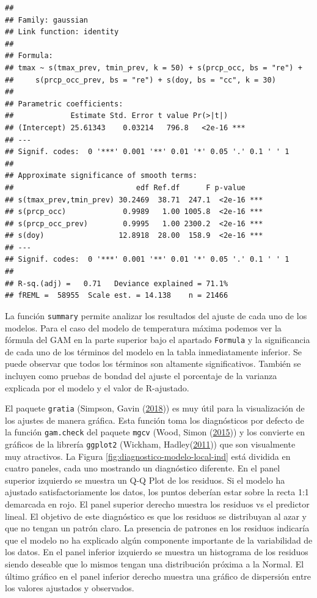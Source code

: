 \documentclass[
  12pt]{article}
\begin{document}
\begin{verbatim}
## 
## Family: gaussian 
## Link function: identity 
## 
## Formula:
## tmax ~ s(tmax_prev, tmin_prev, k = 50) + s(prcp_occ, bs = "re") + 
##     s(prcp_occ_prev, bs = "re") + s(doy, bs = "cc", k = 30)
## 
## Parametric coefficients:
##             Estimate Std. Error t value Pr(>|t|)    
## (Intercept) 25.61343    0.03214   796.8   <2e-16 ***
## ---
## Signif. codes:  0 '***' 0.001 '**' 0.01 '*' 0.05 '.' 0.1 ' ' 1
## 
## Approximate significance of smooth terms:
##                            edf Ref.df      F p-value    
## s(tmax_prev,tmin_prev) 30.2469  38.71  247.1  <2e-16 ***
## s(prcp_occ)             0.9989   1.00 1005.8  <2e-16 ***
## s(prcp_occ_prev)        0.9995   1.00 2300.2  <2e-16 ***
## s(doy)                 12.8918  28.00  158.9  <2e-16 ***
## ---
## Signif. codes:  0 '***' 0.001 '**' 0.01 '*' 0.05 '.' 0.1 ' ' 1
## 
## R-sq.(adj) =   0.71   Deviance explained = 71.1%
## fREML =  58955  Scale est. = 14.138    n = 21466
\end{verbatim}

La función \texttt{summary} permite analizar los resultados del ajuste de cada uno de los modelos. Para el caso del modelo de temperatura máxima podemos ver la fórmula del GAM en la parte superior bajo el apartado \texttt{Formula} y la significancia de cada uno de los términos del modelo en la tabla inmediatamente inferior. Se puede observar que todos los términos son altamente significativos. También se incluyen como pruebas de bondad del ajuste el porcentaje de la varianza explicada por el modelo y el valor de R-ajustado.

El paquete \texttt{gratia} (Simpson, Gavin (\protect\hyperlink{ref-RN5389}{2018})) es muy útil para la visualización de los ajustes de manera gráfica. Esta función toma los diagnósticos por defecto de la función \texttt{gam.check} del paquete \texttt{mgcv} (Wood, Simon (\protect\hyperlink{ref-RN5393}{2015})) y los convierte en gráficos de la librería \texttt{ggplot2} (Wickham, Hadley(\protect\hyperlink{ref-RN5391}{2011})) que son visualmente muy atractivos.
La Figura \ref{fig:diagnostico-modelo-local-ind} está dividida en cuatro paneles, cada uno mostrando un diagnóstico diferente. En el panel superior izquierdo se muestra un Q-Q Plot de los residuos. Si el modelo ha ajustado satisfactoriamente los datos, los puntos deberían estar sobre la recta 1:1 demarcada en rojo. El panel superior derecho muestra los residuos vs el predictor lineal. El objetivo de este diagnóstico es que los residuos se distribuyan al azar y que no tengan un patrón claro. La presencia de patrones en los residuos indicaría que el modelo no ha explicado algún componente importante de la variabilidad de los datos. En el panel inferior izquierdo se muestra un histograma de los residuos siendo deseable que lo mismos tengan una distribución próxima a la Normal. El último gráfico en el panel inferior derecho muestra una gráfico de dispersión entre los valores ajustados y observados.
\end{document}
